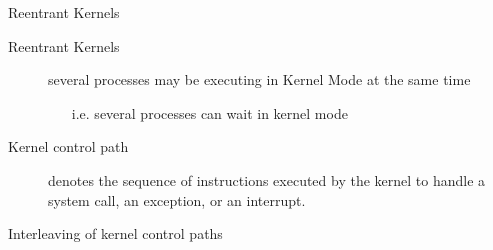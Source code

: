 \begin{frame}{Reentrant Kernels}
  \begin{description}
  \item[Reentrant Kernels] several processes may be executing in Kernel Mode at the same
    time
    \begin{itemize}
    \item[i.e.] several processes can wait in kernel mode
    \end{itemize}
  \item[Kernel control path] denotes the sequence of instructions executed by the kernel
    to handle a system call, an exception, or an interrupt.
  \end{description}
  \begin{exampleblock}{Interleaving of kernel control paths}
    \begin{center}
       
    \end{center}
  \end{exampleblock}
\end{frame}

